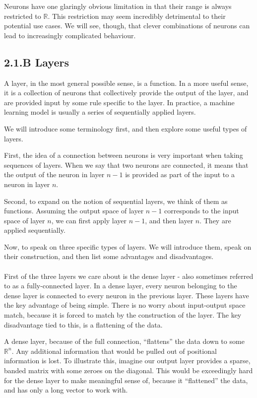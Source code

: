 \documentclass{article}
\begin{document}
Neurons have one glaringly obvious limitation in that their range is always restricted to $\mathbb{R}$. This restriction may seem incredibly detrimental to their potential use cases. We will see, though, that clever combinations of neurons can lead to increasingly complicated behaviour.
\\
\subsection*{2.1.B Layers}
A layer, in the most general possible sense, is a function. In a more useful sense, it is a collection of neurons that collectively provide the output of the layer, and are provided input by some rule specific to the layer. In practice, a machine learning model is usually a series of sequentially applied layers.

We will introduce some terminology first, and then explore some useful types of layers.

First, the idea of a connection between neurons is very important when taking sequences of layers. When we say that two neurons are connected, it means that the output of the neuron in layer $n-1$ is provided as part of the input to a neuron in layer $n$.

Second, to expand on the notion of sequential layers, we think of them as functions. Assuming the output space of layer $n-1$ corresponds to the input space of layer $n$, we can first apply layer $n-1$, and then layer $n$. They are applied sequentially.

Now, to speak on three specific types of layers. We will introduce them, speak on their construction, and then list some advantages and disadvantages.\\\\

First of the three layers we care about is the dense layer - also sometimes referred to as a fully-connected layer. In a dense layer, every neuron belonging to the dense layer is connected to every neuron in the previous layer. These layers have the key advantage of being simple. There is no worry about input-output space match, because it is forced to match by the construction of the layer. The key disadvantage tied to this, is a flattening of the data.

A dense layer, because of the full connection, “flattens” the data down to some $\mathbb{R}^n$. Any additional information that would be pulled out of positional information is lost. To illustrate this, imagine our output layer provides a sparse, banded matrix with some zeroes on the diagonal. This would be exceedingly hard for the dense layer to make meaningful sense of, because it “flattened” the data, and has only a long vector to work with.\\\\
\end{document}
